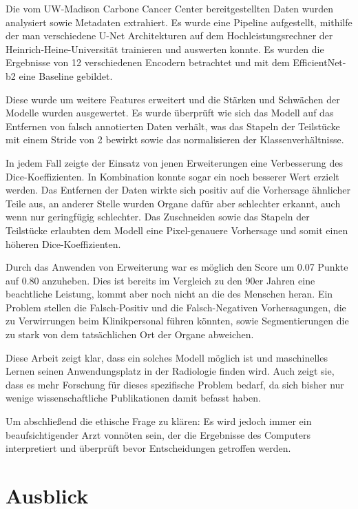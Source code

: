 Die vom UW-Madison Carbone Cancer Center bereitgestellten Daten wurden analysiert sowie Metadaten extrahiert. Es wurde eine Pipeline aufgestellt, mithilfe der man verschiedene U-Net Architekturen auf dem Hochleistungsrechner der Heinrich-Heine-Universität trainieren und auswerten konnte. Es wurden die Ergebnisse von 12 verschiedenen Encodern betrachtet und mit dem EfficientNet-b2 eine Baseline gebildet.

Diese wurde um weitere Features erweitert und die Stärken und Schwächen der Modelle wurden ausgewertet. Es wurde überprüft wie sich das Modell auf das Entfernen von falsch annotierten Daten verhält, was das Stapeln der Teilstücke mit einem Stride von 2 bewirkt sowie das normalisieren der Klassenverhältnisse. 

In jedem Fall zeigte der Einsatz von jenen Erweiterungen eine Verbesserung des Dice-Koeffizienten. In Kombination konnte sogar ein noch besserer Wert erzielt werden. Das Entfernen der Daten wirkte sich positiv auf die Vorhersage ähnlicher Teile aus, an anderer Stelle wurden Organe dafür aber schlechter erkannt, auch wenn nur geringfügig schlechter. Das Zuschneiden sowie das Stapeln der Teilstücke erlaubten dem Modell eine Pixel-genauere Vorhersage und somit einen höheren Dice-Koeffizienten.

Durch das Anwenden von Erweiterung war es möglich den Score um 0.07 Punkte auf 0.80 anzuheben. Dies ist bereits im Vergleich zu den 90er Jahren eine beachtliche Leistung, kommt aber noch nicht an die des Menschen heran. Ein Problem stellen die Falsch-Positiv und die Falsch-Negativen Vorhersagungen, die zu Verwirrungen beim Klinikpersonal führen könnten, sowie Segmentierungen die zu stark von dem tatsächlichen Ort der Organe abweichen.

Diese Arbeit zeigt klar, dass ein solches Modell möglich ist und maschinelles Lernen seinen Anwendungsplatz in der Radiologie finden wird. Auch zeigt sie, dass es mehr Forschung für dieses spezifische Problem bedarf, da sich bisher nur wenige wissenschaftliche Publikationen damit befasst haben.

Um abschließend die ethische Frage zu klären: Es wird jedoch immer ein beaufsichtigender Arzt vonnöten sein, der die Ergebnisse des Computers interpretiert und überprüft bevor Entscheidungen getroffen werden.

\section{Ausblick}

